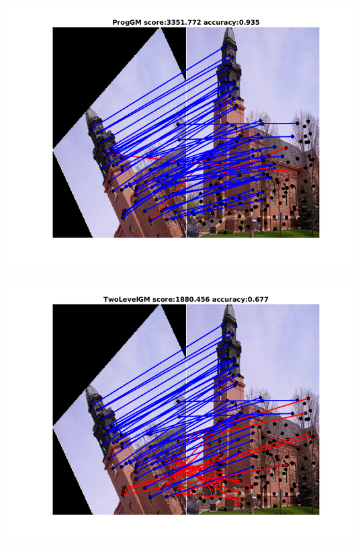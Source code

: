 \begin{figure}[h]
	\begin{subfigure}[b]{0.33\textwidth}
		\centering
		\includegraphics[scale=0.25]{"chapter3/fig/ImageTrafo/anchor_descr/using_cpd_afftrafo/fi_5_ProgGM"} 
	\end{subfigure}%
	\begin{subfigure}[b]{0.33\textwidth}
		\centering
		\includegraphics[scale=0.25]{"chapter3/fig/ImageTrafo/anchor_descr/using_cpd_afftrafo/fi_5_TwoLevelGM"} 
	\end{subfigure} 
	\begin{subfigure}[b]{0.33\textwidth}
		\centering

\end{subfigure}
\end{figure}
